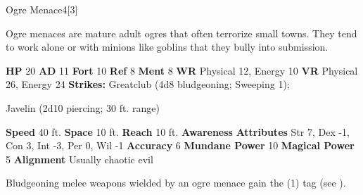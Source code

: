   

  \begin{monsubsection}{Ogre Menace}{4}[3]
    \vspace{-1em}\vspace{-1em}
    \vspace{0em}

    
          Ogre menaces are mature adult ogres that often terrorize small towns.
          They tend to work alone or with minions like goblins that they bully into submission.
        

    \begin{spellcontent}
      \begin{spelltargetinginfo}
        \pari \textbf{HP} 20 \monsep
          \textbf{AD} 11 \monsep
          \textbf{Fort} 10 \monsep
          \textbf{Ref} 8 \monsep
          \textbf{Ment} 8
        \pari \textbf{WR} Physical 12, Energy 10 \monsep
        \textbf{VR} Physical 26, Energy 24
        \pari \textbf{Strikes:}
            Greatclub  (4d8 bludgeoning; Sweeping 1);
\par Javelin  (2d10 piercing; 30 ft. range)
      \end{spelltargetinginfo}
    \end{spellcontent}
    \begin{monsterfooter}
      \pari \textbf{Speed} 40 ft. \monsep
        \textbf{Space} 10 ft. \monsep
        \textbf{Reach} 10 ft.
      \pari \textbf{Awareness} 
      \pari \textbf{Attributes}
        Str 7, Dex -1,
        Con 3, Int -3,
        Per 0, Wil -1
      \pari \textbf{Accuracy} 6 \monsep
        \textbf{Mundane Power} 10 \monsep
      \textbf{Magical Power} 5
      \pari \textbf{Alignment} Usually chaotic evil
    \end{monsterfooter}
  \end{monsubsection}
            Bludgeoning melee weapons wielded by an ogre menace gain the  (1) tag (see ).
  


